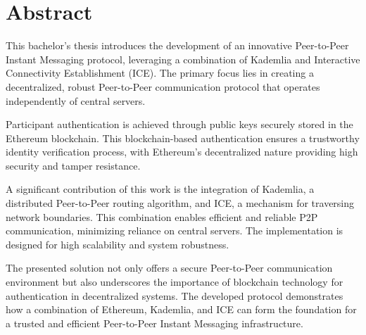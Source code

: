 \chapter*{Abstract}

This bachelor's thesis introduces the development of an innovative Peer-to-Peer Instant Messaging protocol, leveraging a combination of Kademlia and Interactive Connectivity Establishment (ICE). The primary focus lies in creating a decentralized, robust Peer-to-Peer communication protocol that operates independently of central servers.

Participant authentication is achieved through public keys securely stored in the Ethereum blockchain. This blockchain-based authentication ensures a trustworthy identity verification process, with Ethereum's decentralized nature providing high security and tamper resistance.

A significant contribution of this work is the integration of Kademlia, a distributed Peer-to-Peer routing algorithm, and ICE, a mechanism for traversing network boundaries. This combination enables efficient and reliable P2P communication, minimizing reliance on central servers. The implementation is designed for high scalability and system robustness.

The presented solution not only offers a secure Peer-to-Peer communication environment but also underscores the importance of blockchain technology for authentication in decentralized systems. The developed protocol demonstrates how a combination of Ethereum, Kademlia, and ICE can form the foundation for a trusted and efficient Peer-to-Peer Instant Messaging infrastructure.